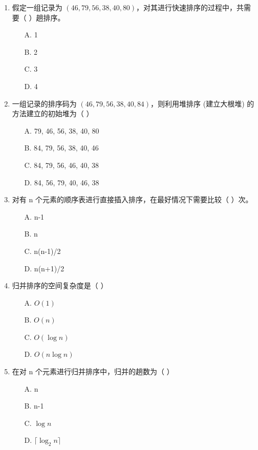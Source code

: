 \documentclass[12pt, a4paper]{article}
\begin{document}
\begin{enumerate}[label=\arabic*.]
	\item 假定一组记录为 $(46, 79, 56, 38, 40, 80)$，对其进行快速排序的过程中，共需要（ ）趟排序。
	      \begin{enumerate}
		      \item[A.] 1
		      \item[B.] 2
		      \item[C.] 3
		      \item[D.] 4
	      \end{enumerate}

	\item 一组记录的排序码为 $(46, 79, 56, 38, 40, 84)$，则利用堆排序 (建立大根堆) 的方法建立的初始堆为（ ）
	      \begin{enumerate}
		      \item[A.] 79, 46, 56, 38, 40, 80
		      \item[B.] 84, 79, 56, 38, 40, 46
		      \item[C.] 84, 79, 56, 46, 40, 38
		      \item[D.] 84, 56, 79, 40, 46, 38
	      \end{enumerate}

	\item 对有 n 个元素的顺序表进行直接插入排序，在最好情况下需要比较（ ）次。
	      \begin{enumerate}
		      \item[A.] n-1
		      \item[B.] n
		      \item[C.] n(n-1)/2
		      \item[D.] n(n+1)/2
	      \end{enumerate}

	\item 归并排序的空间复杂度是（ ）
	      \begin{enumerate}
		      \item[A.] $O(1)$
		      \item[B.] $O(n)$
		      \item[C.] $O(\log n)$
		      \item[D.] $O(n \log n)$
	      \end{enumerate}

	\item 在对 n 个元素进行归并排序中，归并的趟数为（ ）
	      \begin{enumerate}
		      \item[A.] n
		      \item[B.] n-1
		      \item[C.] $\log n$
		      \item[D.] $\lceil \log_2 n \rceil$
	      \end{enumerate}


\end{enumerate}
\end{document}
